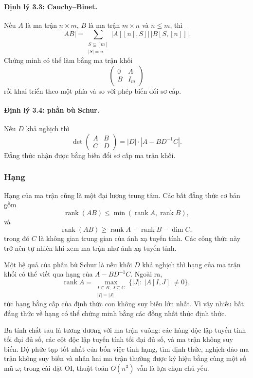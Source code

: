 \documentclass[11pt]{article}
\begin{document}
\paragraph{Định lý 3.3: Cauchy--Binet.}
Nếu $A$ là ma trận $n\times m$, $B$ là ma trận $m\times n$ và $n\le m$, thì
\[
  |AB|=\sum_{\substack{S\subseteq [m]\\ |S|=n}} |A[[n],S]|\,|B[S,[n]]|.
\]
Chứng minh có thể làm bằng ma trận khối
\[
  \begin{pmatrix}
  0 & A\\
  B & I_m
  \end{pmatrix}
\]
rồi khai triển theo một phía và so với phép biến đổi sơ cấp.

\paragraph{Định lý 3.4: phần bù Schur.}
Nếu $D$ khả nghịch thì
\[
  \det\begin{pmatrix}A&B\\ C&D\end{pmatrix}
  = |D|\cdot |A-BD^{-1}C|.
\]
Đẳng thức nhận được bằng biến đổi sơ cấp ma trận khối.

\subsubsection{Hạng}

Hạng của ma trận cũng là một đại lượng trung tâm. Các bất đẳng thức cơ bản gồm
\[
  \operatorname{rank}(AB)\le
  \min(\operatorname{rank}A,\operatorname{rank}B),
\]
và
\[
  \operatorname{rank}(AB)\ge
  \operatorname{rank}A+\operatorname{rank}B-\dim C,
\]
trong đó $C$ là không gian trung gian của ánh xạ tuyến tính. Các công thức này
trở nên tự nhiên khi xem ma trận như ánh xạ tuyến tính.

Một hệ quả của phần bù Schur là nếu khối $D$ khả nghịch thì hạng của ma trận
khối có thể viết qua hạng của $A-BD^{-1}C$. Ngoài ra,
\[
  \operatorname{rank}A=
  \max_{\substack{I\subseteq R,\ J\subseteq C\\ |I|=|J|}}
  \{|J|:\ |A[I,J]|\ne 0\},
\]
tức hạng bằng cấp của định thức con không suy biến lớn nhất. Vì vậy nhiều bất
đẳng thức về hạng có thể chứng minh bằng các đồng nhất thức định thức.

Ba tính chất sau là tương đương với ma trận vuông: các hàng độc lập tuyến tính
tối đại đủ số, các cột độc lập tuyến tính tối đại đủ số, và ma trận không suy
biến. Độ phức tạp tốt nhất của bốn việc tính hạng, tìm định thức, nghịch đảo
ma trận không suy biến và nhân hai ma trận thường được ký hiệu bằng cùng một
số mũ $\omega$; trong cài đặt OI, thuật toán $O(n^3)$ vẫn là lựa chọn chủ yếu.
\end{document}
